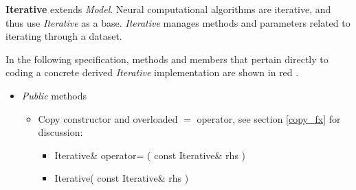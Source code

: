 \documentclass{report}
\def\beginred{\color{red}}
\def\endcolor{\color{black}}
\begin{document}
{\bf Iterative} extends {\em Model}.  Neural computational algorithms
are iterative, and thus use {\em Iterative} as a base.  {\em
Iterative} manages methods and parameters related to iterating through
a dataset.

In the following specification, methods and members that pertain
directly to coding a concrete derived {\em Iterative} implementation
are shown in \beginred red \endcolor.

\begin{itemize}

\item {\em Public} methods

\begin{itemize}

\item Copy constructor and overloaded $=$ operator, see section
\ref{copy_fx} for discussion:
\begin{itemize}
\item Iterative\& operator= ( const Iterative\& rhs )
\item Iterative( const Iterative\& rhs )
\end{itemize}


\end{itemize}
\end{itemize}
\end{document}
